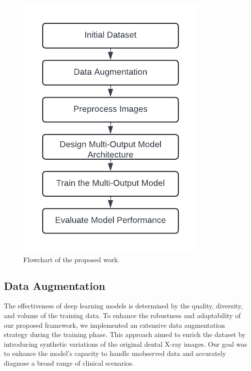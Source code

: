 \documentclass[journal,twoside,web]{ieeecolor}
\begin{document}
\begin{figure}[!t]
    \centerline{\includegraphics[width=\columnwidth]{flowchart.png}}
    \caption{Flowchart of the proposed work.}
    \label{flowchart}
\end{figure}

\subsection{Data Augmentation}

The effectiveness of deep learning models is determined by the quality, diversity, and volume of the training data. To enhance the robustness and adaptability of our proposed framework, we implemented an extensive data augmentation strategy during the training phase. This approach aimed to enrich the dataset by introducing synthetic variations of the original dental X-ray images. Our goal was to enhance the model's capacity to handle unobserved data and accurately diagnose a broad range of clinical scenarios.
\end{document}
